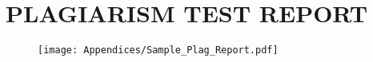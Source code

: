 
\chapter*{PLAGIARISM TEST REPORT}
\label{app-plagiarism}

%


 \begin{figure}[H]
    \centering
    \texttt{[image: Appendices/Sample\_Plag\_Report.pdf]}
    \label{plagreport}
\end{figure}
